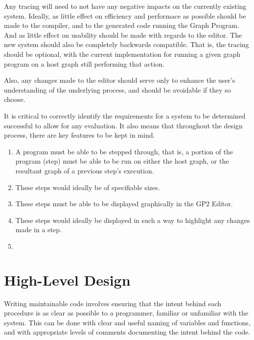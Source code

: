 \documentclass{UoYCSproject}
\begin{document}
Any tracing will need to not have any negative impacts on the currently existing system. Ideally, as little effect on efficiency and performace as possible should be made to the compiler, and to the generated code running the Graph Program. And as little effect on usability should be made with regards to the editor. The new system should also be completely backwards compatible. That is, the tracing should be optional, with the current implementation for running a given graph program on a host graph still performing that action.

Also, any changes made to the editor should serve only to enhance the user's understanding of the underlying process, and should be avoidable if they so choose.

It is critical to correctly identify the requirements for a system to be determined successful to allow for any evaluation. It also means that throughout the design process, there are key features to be kept in mind.
\begin{enumerate}
	\item A program must be able to be stepped through, that is, a portion of the program (step) must be able to be run on either the host graph, or the resultant graph of a previous step's execution.
	\item These steps would ideally be of specifiable sizes.
	\item These steps must be able to be displayed graphically in the GP2 Editor.
	\item These steps would ideally be displayed in such a way to highlight any changes made in a step.
	\item 
\end{enumerate}

\section{High-Level Design}
Writing maintainable code involves ensuring that the intent behind each procedure is as clear as possible to a programmer, familiar or unfamiliar with the system. This can be done with clear and useful naming of variables and functions, and with appropriate levels of comments documenting the intent behind the code.
\end{document}
